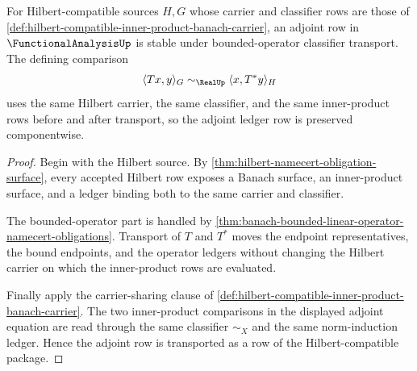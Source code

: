 \begin{theorem}
\label{thm:functionalanalysis-adjoint-stability-obligation}
For Hilbert-compatible sources $H,G$ whose carrier and classifier rows are
those of \autoref{def:hilbert-compatible-inner-product-banach-carrier}, an
adjoint row in $\FunctionalAnalysisUp$ is stable under bounded-operator
classifier transport. The defining comparison
$$
\langle Tx,y\rangle_G \sim_{\RealUp} \langle x,T^\ast y\rangle_H
$$
uses the same Hilbert carrier, the same classifier, and the same
inner-product rows before and after transport, so the adjoint ledger row is
preserved componentwise.
\end{theorem}
\begin{proof}
Begin with the Hilbert source. By
\autoref{thm:hilbert-namecert-obligation-surface}, every accepted Hilbert row
exposes a Banach surface, an inner-product surface, and a ledger binding both
to the same carrier and classifier.

The bounded-operator part is handled by
\autoref{thm:banach-bounded-linear-operator-namecert-obligations}. Transport
of $T$ and $T^\ast$ moves the endpoint representatives, the bound endpoints,
and the operator ledgers without changing the Hilbert carrier on which the
inner-product rows are evaluated.

Finally apply the carrier-sharing clause of
\autoref{def:hilbert-compatible-inner-product-banach-carrier}. The two
inner-product comparisons in the displayed adjoint equation are read through
the same classifier $\sim_X$ and the same norm-induction ledger. Hence the
adjoint row is transported as a row of the Hilbert-compatible package.
\end{proof}

